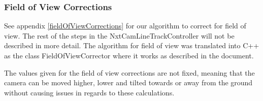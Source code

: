 

\subsubsection{Field of View Corrections}
See appendix \ref{fieldOfViewCorrections} for our algorithm to correct for field of view. The rest of the steps in the NxtCamLineTrackController will not be described in more detail. The algorithm for field of view was translated into C++ as the class FieldOfViewCorrector where it works as described in the document. 

The values given for the field of view corrections are not fixed, meaning that the camera can be moved higher, lower and tilted towards or away from the ground without causing issues in regards to these calculations. 